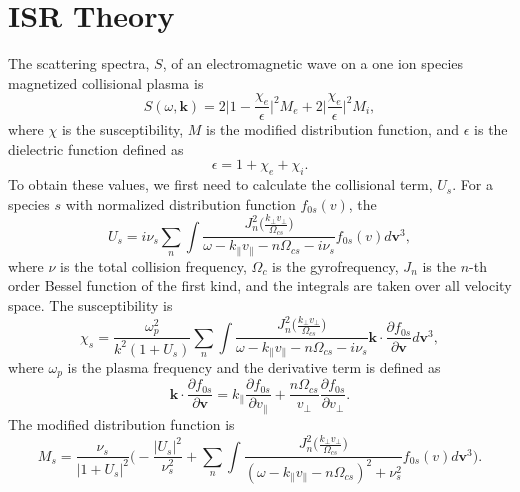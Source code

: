 \section{ISR Theory}
\label{s:ISR-spectra}
The scattering spectra, $S$, of an electromagnetic wave on a one ion species magnetized collisional plasma is
\begin{equation}
	S(\omega,\mathbf{k}) = 2 \Big| 1 - \frac{\chi_e}{\epsilon}\Big|^2 M_e
	+ 2\Big|\frac{\chi_e}{\epsilon}\Big|^2 M_i,
	\label{eq:scattering-spectra}
\end{equation}
where $\chi$ is the susceptibility, 
$M$ is the modified distribution function,
and $\epsilon$ is the dielectric function defined as
\begin{equation}
	\epsilon = 1 + \chi_e + \chi_i.
	\label{eq:dielectric}
\end{equation}
To obtain these values, we first need to calculate the collisional term, $U_s$. %
For a species $s$ with normalized distribution function $f_{0s}(v)$, the 
\begin{equation}
	U_s = i \nu_s \sum_n \int 
	\frac{J_n^2\Big( \tfrac{k_\perp v_\perp}{\Omega_{cs}} \Big)}
	{\omega - k_\parallel v_\parallel - n\Omega_{cs} - i\nu_s}  
	f_{0s}(v)   d\mathbf{v}^3 ,
	\label{eq:Us}
\end{equation}
where $\nu$ is the total collision frequency,
$\Omega_{c}$ is the gyrofrequency,
$J_n$ is the $n$-th order Bessel function of the first kind,
and the integrals are taken over all velocity space.
The susceptibility is
\begin{equation}
	\chi_s = \frac{\omega_p^2}{k^2(1+U_s)} \sum_n \int 
	\frac{J_n^2\Big( \tfrac{k_\perp v_\perp}{\Omega_{cs}} \Big)}
	{\omega - k_\parallel v_\parallel - n\Omega_{cs} - i\nu_s}  
	\mathbf{k} \cdot \frac{\partial f_{0s}}{\partial \mathbf{v}}   d\mathbf{v}^3 ,
	\label{eq:chis}
\end{equation} 
where $\omega_p$ is the plasma frequency
and the derivative term is defined as
\begin{equation}
	\mathbf{k} \cdot \frac{\partial f_{0s}}{\partial \mathbf{v}} = 
	k_\parallel \frac{\partial f_{0s}}{\partial v_\parallel}
	+ \frac{n \Omega_{cs}}{v_\perp} \frac{\partial f_{0s}}{\partial v_\perp}.
	\label{eq:chis_derivative}
\end{equation}
The modified distribution function is 
\begin{equation}
	M_s = \frac{\nu_s}{|1+U_s|^2}
	\Bigg( - \frac{|U_s|^2}{\nu_s^2} 
	+ \sum_n \int 
	\frac{J_n^2\Big( \tfrac{k_\perp v_\perp}{\Omega_{cs}} \Big)}
	{(\omega - k_\parallel v_\parallel - n\Omega_{cs})^2 + \nu_s^2}
	f_{0s}(v)   d\mathbf{v}^3 \Bigg).
	\label{eq:Ms}
\end{equation}

